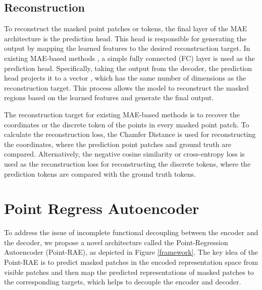 \documentclass[sigconf, screen]{acmart}
\begin{document}
\subsection{Reconstruction}

To reconstruct the masked point patches or tokens, the final layer of the MAE architecture is the prediction head. This head is responsible for generating the output by mapping the learned features to the desired reconstruction target. In existing MAE-based methods \cite{pang2022masked, dong2022autoencoders}, a simple fully connected (FC) layer is used as the prediction head. Specifically, taking the output  from the decoder, the prediction head projects it to a vector , which has the same number of dimensions as the reconstruction target. This process allows the model to reconstruct the masked regions based on the learned features and generate the final output.



The reconstruction target for existing MAE-based methods is to recover the coordinates \cite{pang2022masked} or the discrete token \cite{dong2022autoencoders} of the points in every masked point patch.
To calculate the reconstruction loss, the  Chamfer Distance \cite{fan2017point} is used for reconstructing the coordinates, where the prediction point patches  and ground truth  are compared. Alternatively, the negative cosine similarity \cite{dong2022autoencoders} or cross-entropy loss \cite{yu2022point} is used as the reconstruction loss for reconstructing the discrete tokens, where the prediction tokens are compared with the ground truth tokens.


\section{Point Regress Autoencoder}
To address the issue of incomplete functional decoupling between the encoder and the decoder, we propose a novel architecture called the Point-Regression Autoencoder (Point-RAE), as depicted in Figure \ref{framework}.
The key idea of the Point-RAE is to predict masked patches in the encoded representation space from visible patches and then map the predicted representations of masked patches to the corresponding targets, which helps to decouple the encoder and decoder.
\end{document}
